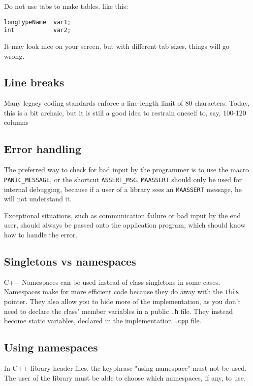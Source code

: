 \documentclass {article}
\begin{document}
Do not use tabs to make tables, like this:
\begin{verbatim} 
longTypeName  var1;
int           var2;
\end{verbatim}
It may look nice on your screen, but with different tab sizes, things will go wrong.

\subsection{Line breaks}
Many legacy coding standards enforce a line-length limit of 80 characters. Today, this is a bit archaic, but it is still a good idea to restrain oneself to, say, 100-120 columns

\subsection{Error handling}

The preferred way to check for bad input by the programmer is to use the macro \verb|PANIC_MESSAGE|, or the shortcut \verb|ASSERT_MSG|. \verb|MAASSERT| should only be used for internal debugging, because if a user of a library sees an \verb|MAASSERT| message, he will not understand it.

Exceptional situations, such as communication failure or bad input by the end user, should always be passed onto the application program, which should know how to handle the error.


\subsection{Singletons vs namespaces}

C++ Namespaces can be used instead of class singletons in some cases. Namespaces make for more efficient code because they do away with the \verb|this| pointer. They also allow you to hide more of the implementation, as you don't need to declare the class' member variables in a public \verb|.h| file. They instead become static variables, declared in the implementation \verb|.cpp| file.


\subsection{Using namespaces}

In C++ library header files, the keyphrase "using namespace" must not be used. The user of the library must be able to choose which namespaces, if any, to use.
\end{document}
